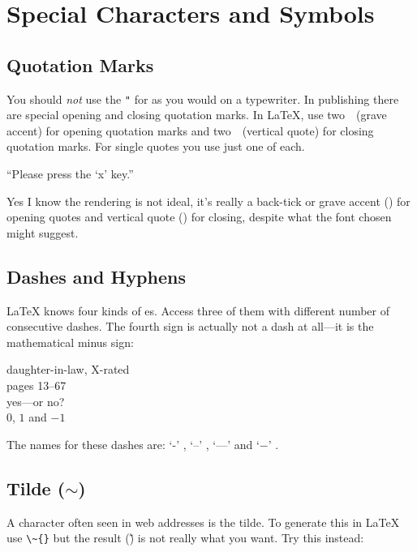\section{Special Characters and Symbols}
 
\subsection{Quotation Marks}

You should \emph{not} use the \verb|"| for 
 as you would on a typewriter.  In publishing
there are special opening and closing quotation marks.  In \LaTeX{},
use two~\textasciigrave~(grave accent) for opening quotation marks and
two~\textquotesingle~(vertical quote) for closing quotation marks. For single
quotes you use just one of each.
\begin{example}
``Please press the `x' key.''
\end{example}
Yes I know the rendering is not ideal, it's really a back-tick or grave accent
(\textasciigrave) for
opening quotes and vertical quote (\textquotesingle) for closing, despite what the font chosen might suggest.

\subsection{Dashes and Hyphens}

\LaTeX{} knows four kinds of es. Access three of
them with different number of consecutive dashes. The fourth sign
is actually not a dash at all---it is the mathematical minus sign: \index{-}
\index{--} \index{---}  

\begin{example}
daughter-in-law, X-rated\\
pages 13--67\\
yes---or no? \\
$0$, $1$ and $-1$
\end{example}
The names for these dashes are: 
`-' , `--' , `---'  and
`$-$' .

\subsection{Tilde ($\sim$)}
A character often seen in web addresses is the tilde. To generate
this in \LaTeX{} use \verb|\~{}| but the result (\~) is not really
what you want. Try this instead:

